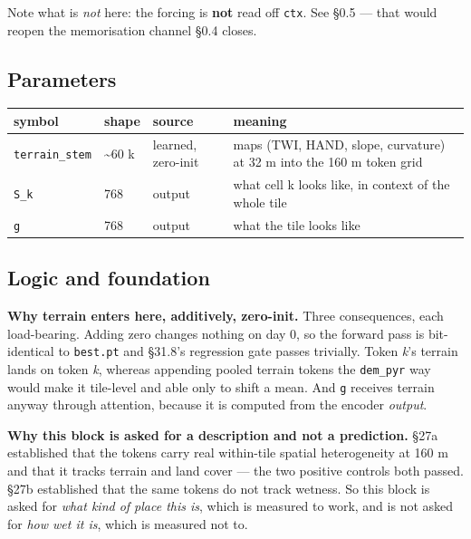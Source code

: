 \documentclass[10pt,a4paper]{article}
\begin{document}
Note what is \emph{not} here: the forcing is \textbf{not} read off \texttt{ctx}. See §0.5 — that
would reopen the memorisation channel §0.4 closes.

\subsection*{Parameters}

\begin{center}
\small
\begin{tabularx}{\linewidth}{XXXX}
\toprule
\textbf{symbol} & \textbf{shape} & \textbf{source} & \textbf{meaning} \\
\midrule
\texttt{terrain\_stem} & \textasciitilde{}60 k & learned, zero-init & maps (TWI, HAND, slope, curvature) at 32 m into the 160 m token grid \\
\texttt{S\_k} & 768 & output & what cell k looks like, in context of the whole tile \\
\texttt{g} & 768 & output & what the tile looks like \\
\bottomrule
\end{tabularx}
\end{center}

\subsection*{Logic and foundation}

\textbf{Why terrain enters here, additively, zero-init.} Three consequences, each
load-bearing. Adding zero changes nothing on day 0, so the forward pass is
bit-identical to \texttt{best.pt} and §31.8's regression gate passes trivially. Token
\emph{k}'s terrain lands on token \emph{k}, whereas appending pooled terrain tokens the
\texttt{dem\_pyr} way would make it tile-level and able only to shift a mean. And \texttt{g}
receives terrain anyway through attention, because it is computed from the
encoder \emph{output}.

\textbf{Why this block is asked for a description and not a prediction.} §27a
established that the tokens carry real within-tile spatial heterogeneity at
160 m and that it tracks terrain and land cover — the two positive controls
both passed. §27b established that the same tokens do not track wetness. So
this block is asked for \emph{what kind of place this is}, which is measured to
work, and is not asked for \emph{how wet it is}, which is measured not to.
\end{document}
